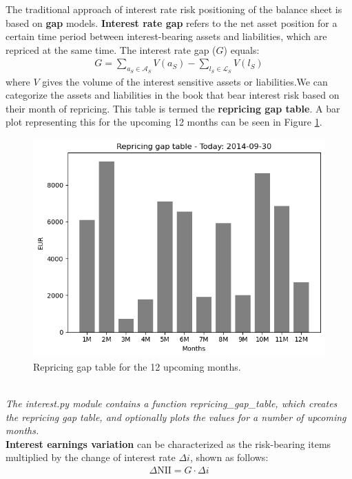 \documentclass[11pt]{report}
\begin{document}
 The traditional approach of interest rate risk positioning of the balance sheet is based on \textbf{gap} models. \textbf{Interest rate gap} refers to the net asset position for a certain time period between interest-bearing assets and liabilities, which are repriced at the same time. The interest rate gap ($G$) equals:
\begin{align}
	G=\sum_{a_S\in\mathcal{A}_S}V(a_S)-\sum_{l_S\in\mathcal{L}_S}V(l_S)
\end{align}
where $V$ gives the volume of the interest sensitive assets or liabilities.We can categorize the assets and liabilities in the book that bear interest risk based on their month of repricing. This table is termed the \textbf{repricing gap table}. A bar plot representing this for the upcoming 12 months can be seen in Figure \ref{repricing_gap_table}.\begin{figure}[ht!]\label{repricing_gap_table}
	\centering
	\includegraphics[scale=0.4]{images/reprGapTable}	
	\caption{Repricing gap table for the 12 upcoming months.}
\end{figure}\\

\textit{The interest.py module contains a function repricing\_gap\_table, which creates the repricing gap table, and optionally plots the values for a number of upcoming months.}
\\

\textbf{Interest earnings variation} can be characterized as the risk-bearing items multiplied by the change of interest rate $\Delta i$, shown as follows:
\begin{align}
	\Delta\text{NII}=G\cdot \Delta i
\end{align}
\end{document}
